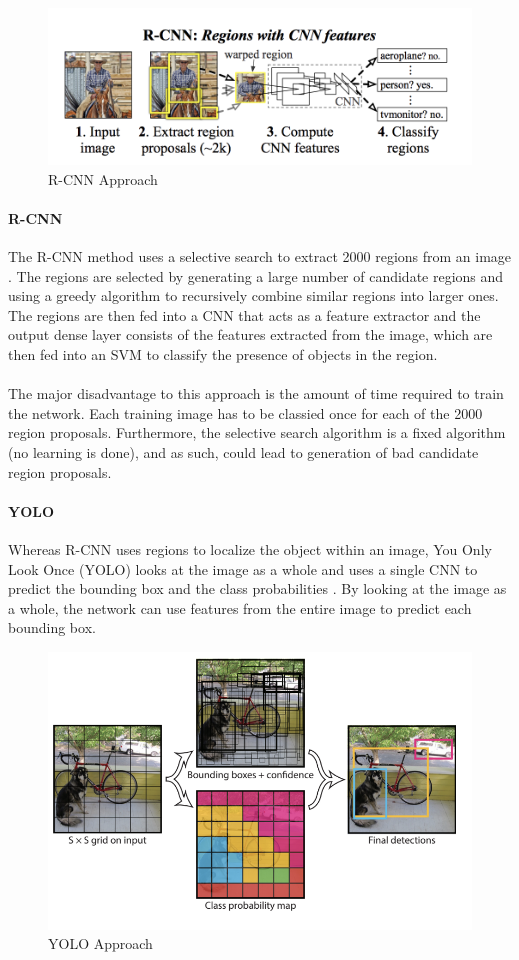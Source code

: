 \begin{figure}[ht]
	\centering
	\includegraphics[width=.9\linewidth]{img/chapter2_background/rcnn.png}
	\caption{R-CNN Approach}
\end{figure}

\paragraph{R-CNN} The R-CNN method uses a selective search to extract 2000 regions from an image \cite{Girshick2014}. The regions are selected by generating a large number of candidate regions and using a greedy algorithm to recursively combine similar regions into larger ones. The regions are then fed into a CNN that acts as a feature extractor and the output dense layer consists of the features extracted from the image, which are then fed into an SVM to classify the presence of objects in the region.

\paragraph{}The major disadvantage to this approach is the amount of time required to train the network. Each training image has to be classied once for each of the 2000 region proposals. Furthermore, the selective search algorithm is a fixed algorithm (no learning is done), and as such, could lead to generation of bad candidate region proposals.

\paragraph{YOLO} Whereas R-CNN uses regions to localize the object within an image, You Only Look Once (YOLO) looks at the image as a whole and uses a single CNN to predict the bounding box and the class probabilities \cite{Redmon}. By looking at the image as a whole, the network can use features from the entire image to predict each bounding box.

\begin{figure}[ht]
	\centering
	\includegraphics[width=.6\linewidth]{img/chapter2_background/yoloApproach.png}
	\caption{YOLO Approach}
\end{figure}


